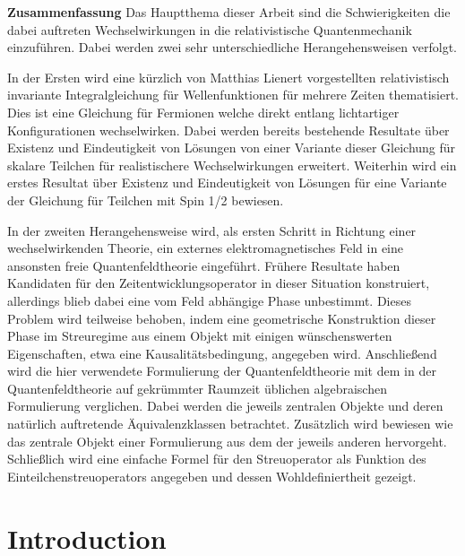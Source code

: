 \documentclass[b5paper,draft,openbib,12pt]{memoir}
\begin{document}
{\large \textbf{Zusammenfassung}}
Das Hauptthema dieser Arbeit sind die Schwierigkeiten die 
dabei auftreten Wechselwirkungen in die relativistische 
Quantenmechanik einzuführen. Dabei werden zwei sehr unterschiedliche
Herangehensweisen verfolgt.

In der Ersten wird eine kürzlich von Matthias Lienert vorgestellten 
relativistisch invariante Integralgleichung für Wellenfunktionen 
für mehrere Zeiten thematisiert. Dies ist eine Gleichung für 
Fermionen welche direkt entlang lichtartiger Konfigurationen 
wechselwirken. Dabei werden bereits bestehende Resultate über 
Existenz und Eindeutigkeit von Lösungen von einer Variante dieser 
Gleichung für skalare Teilchen für realistischere Wechselwirkungen
erweitert. Weiterhin wird ein erstes Resultat über Existenz und 
Eindeutigkeit von Lösungen für eine Variante der Gleichung 
für Teilchen mit Spin 1/2 bewiesen.

In der zweiten Herangehensweise wird, als ersten Schritt in 
Richtung einer wechselwirkenden Theorie, ein externes 
elektromagnetisches Feld in eine ansonsten freie Quantenfeldtheorie
eingeführt. Frühere Resultate haben Kandidaten für den 
Zeitentwicklungsoperator in dieser Situation konstruiert, 
allerdings blieb dabei eine vom Feld abhängige Phase unbestimmt.
Dieses Problem wird teilweise behoben, indem eine geometrische 
Konstruktion dieser Phase im Streuregime aus einem 
Objekt mit einigen wünschenswerten Eigenschaften, 
etwa eine Kausalitätsbedingung, angegeben wird. 
Anschließend wird die hier verwendete Formulierung der 
Quantenfeldtheorie mit dem in der Quantenfeldtheorie auf 
gekrümmter Raumzeit üblichen algebraischen Formulierung 
verglichen. Dabei werden die jeweils zentralen Objekte
 und deren 
natürlich auftretende Äquivalenzklassen betrachtet.
Zusätzlich wird bewiesen wie das zentrale Objekt einer 
Formulierung aus dem der jeweils anderen hervorgeht. 
Schließlich wird eine einfache Formel für den Streuoperator 
als Funktion des Einteilchenstreuoperators angegeben und
dessen Wohldefiniertheit gezeigt.





\tableofcontents

\newpage



\mainmatter

\chapter{Introduction}
\lipsum[1]
\end{document}
